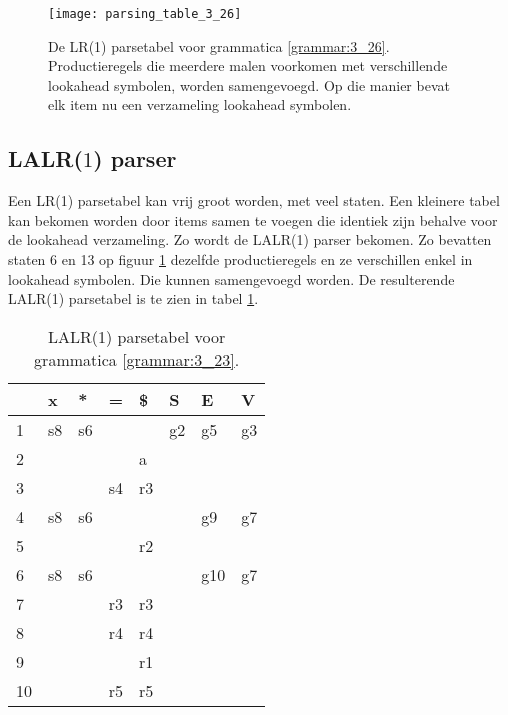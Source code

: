 \begin{figure}[ht]
	\centering
	\texttt{[image: parsing\_table\_3\_26]}
	\caption{De LR(1) parsetabel voor grammatica \ref{grammar:3_26}. Productieregels die meerdere malen voorkomen met verschillende lookahead symbolen, worden samengevoegd. Op die manier bevat elk item nu een verzameling lookahead symbolen.}
	\label{fig:parsing_table_3_26}
\end{figure}


\subsection{LALR($1$) parser}
Een LR(1) parsetabel kan vrij groot worden, met veel staten. Een kleinere tabel kan bekomen worden door items samen te voegen die identiek zijn behalve voor de lookahead verzameling. Zo wordt de LALR(1) parser bekomen. Zo bevatten staten 6 en 13 op figuur \ref{fig:parsing_table_3_26} dezelfde productieregels en ze verschillen enkel in lookahead symbolen. Die kunnen samengevoegd worden. De resulterende LALR(1) parsetabel is te zien in tabel \ref{table:slr_parse_table_3_26_LALR}. 

\begin{table}[ht]
	\centering
	\begin{tabular}{l|llll|lll|}
		& x   & *  & = & \$ & S  & E  & V \\
		\hline
		1 & s8  & s6 &   &    & g2 & g5 & g3 \\
		2 &     &    &   &  a &    &    &    \\
		3 &     &    & s4& r3 &    &    &    \\
		4 & s8  & s6 &   &    &    & g9 &  g7  \\
		5 &     &    &   & r2 &    &    &    \\
		6 & s8  & s6 &   &    &    & g10& g7\\
		7 &     &    & r3 & r3 &    &    &    \\
		8 &     &    &r4 & r4 &    &    &    \\
		9 &     &    &   & r1 &    &    &    \\
		10 &     &    & r5& r5 &    &    &    \\
		\hline
	\end{tabular}
	\caption{LALR(1) parsetabel voor grammatica \ref{grammar:3_23}.}
	\label{table:slr_parse_table_3_26_LALR}
\end{table}